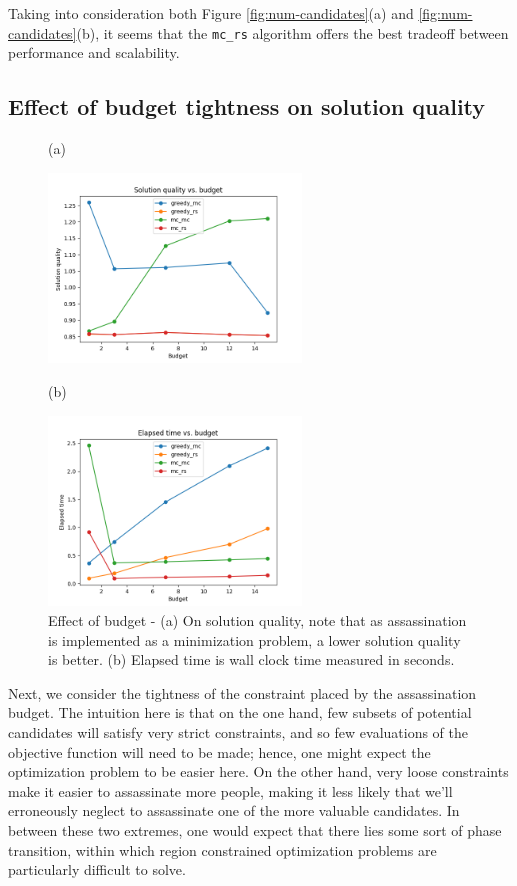 Taking into consideration both Figure \ref{fig:num-candidates}(a) and \ref{fig:num-candidates}(b), it seems that the \texttt{mc\_rs} algorithm offers the best tradeoff between performance and scalability.

\subsection{Effect of budget tightness on solution quality}

\begin{figure}[h!]
	\centering
	
	(a)
	 
	 \includegraphics[width=0.6\textwidth]{figs/budget_results_multi_ground_set_plot.png}

	(b)
	
	 \includegraphics[width=0.6\textwidth]{figs/budget_results_multi_ground_set_time_plot.png}
	\caption{Effect of budget - (a) On solution quality, note that as assassination is implemented as a minimization problem, a lower solution quality is better. (b) Elapsed time is wall clock time measured in seconds.}
	\label{fig:budget}
\end{figure}

Next, we consider the tightness of the constraint placed by the assassination budget.
The intuition here is that on the one hand, few subsets of potential candidates will satisfy very strict constraints, and so few evaluations of the objective function will need to be made; hence, one might expect the optimization problem to be easier here.
On the other hand, very loose constraints make it easier to assassinate more people, making it less likely that we'll erroneously neglect to assassinate one of the more valuable candidates.
In between these two extremes, one would expect that there lies some sort of phase transition, within which region constrained optimization problems are particularly difficult to solve.

